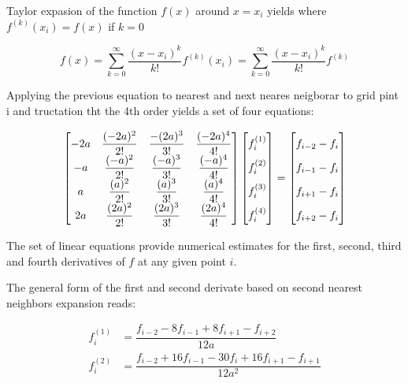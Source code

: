 Taylor expasion of the function $f(x)$ around $x=x_i$ yields where $f^{(k)}(x_i) = f(x)$ if $k=0$

$$f(x) = \sum\limits_{k=0}^{\infty} \dfrac{(x-x_i)^k}{k!}f^{(k)}(x_i) = \sum\limits_{k=0}^{\infty} \dfrac{(x-x_i)^k}{k!}f^{(k)}$$

Applying the previous equation to nearest and next neares neigborar to grid pint i and tructation tht the 4th order yields a set of four equations:

\begin{align}
\begin{bmatrix}
    -2a & \dfrac{(-2a)^2}{2!} & \dfrac{-(2a)^3}{3!} & \dfrac{(-2a)^4}{4!}\\
    -a & \dfrac{(-a)^2}{2!} & \dfrac{(-a)^3}{3!} & \dfrac{(-a)^4}{4!}\\
    a & \dfrac{(a)^2}{2!} & \dfrac{(a)^3}{3!} & \dfrac{(a)^4}{4!}\\
    2a & \dfrac{(2a)^2}{2!} & \dfrac{(2a)^3}{3!} & \dfrac{(2a)^4}{4!}
\end{bmatrix}
\begin{bmatrix}
    f_i^{(1)}  \vphantom{ \dfrac{d^4}{d} }\\
    f_i^{(2)}  \vphantom{ \dfrac{d^4}{d} } \\
    f_i^{(3)}  \vphantom{ \dfrac{d^4}{d} } \\
    f_i^{(4)}  \vphantom{ \dfrac{d^4}{d} }
\end{bmatrix}
=
\begin{bmatrix}
    f_{i-2} - f_{i}    \vphantom{ \dfrac{d^4}{d}} \\
    f_{i-1} - f_{i}    \vphantom{ \dfrac{d^4}{d}} \\
    f_{i+1} - f_{i}    \vphantom{ \dfrac{d^4}{d}} \\
    f_{i+2} - f_{i}    \vphantom{ \dfrac{d^4}{d}} 
\end{bmatrix}
\end{align}

The set of linear equations provide numerical estimates for the first, second, third and fourth derivatives of $f$ at any given point $i$.

The general form of the first and second derivate based on second nearest neighbors expansion reads:

\begin{align*}
f^{(1)}_i &= \dfrac{f_{i-2}-8f_{i-1} + 8f_{i+1} - f_{i+2}}{12a} \\
f^{(2)}_i &= \dfrac{f_{i-2}+16f_{i-1} -30f_{i} + 16f_{i+1} - f_{i+1}}{12a^2}
\end{align*}


